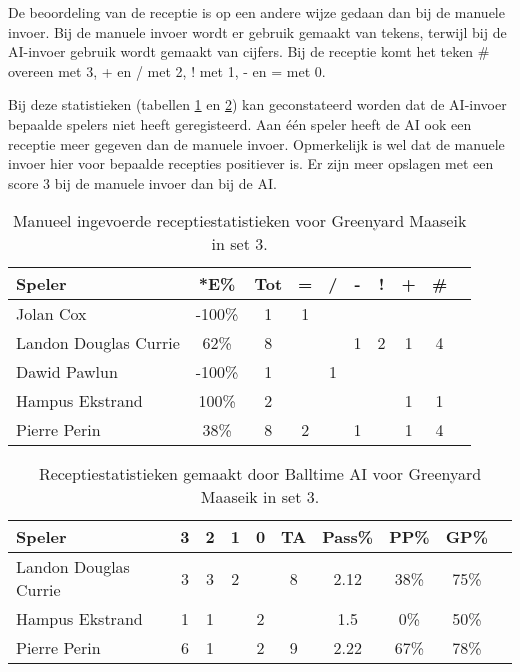 De beoordeling van de receptie is op een andere wijze gedaan dan bij de manuele invoer. Bij de manuele invoer wordt er gebruik gemaakt van tekens, terwijl bij de AI-invoer gebruik wordt gemaakt van cijfers. Bij de receptie komt het teken \# overeen met 3, + en / met 2, ! met 1, - en = met 0.

Bij deze statistieken (tabellen \ref{tab:PL3ReceiveMaaseikMan3} en \ref{tab:PL3ReceiveMaaseikAI3}) kan geconstateerd worden dat de AI-invoer bepaalde spelers niet heeft geregisteerd. Aan één speler heeft de AI ook een receptie meer gegeven dan de manuele invoer. Opmerkelijk is wel dat de manuele invoer hier voor bepaalde recepties positiever is. Er zijn meer opslagen met een score 3 bij de manuele invoer dan bij de AI.

\begin{table}[ht!]
    \centering
    \scriptsize
    \begin{tabular}{|l|c|c|c|c|c|c|c|c|c|} \hline
        \textbf{Speler} & *E\% & Tot & = & / & - & ! & + & \#\\ \hline
        Jolan Cox & -100\% & 1 & 1 &  &  &  &  & \\ 
        Landon Douglas Currie & 62\% & 8 &  &  & 1 & 2 & 1 & 4 \\ 
        Dawid Pawlun & -100\% & 1 &  & 1 &  &  &  &  \\ 
        Hampus Ekstrand & 100\% & 2 &  &  &  &  & 1 & 1 \\ 
        Pierre Perin & 38\% & 8 & 2 &  & 1 &  & 1 & 4 \\ \hline
    \end{tabular}
    \caption[Manueel ingevoerde receptiestatistieken voor Greenyard Maaseik in set 3]{\label{tab:PL3ReceiveMaaseikMan3}Manueel ingevoerde receptiestatistieken voor Greenyard Maaseik in set 3.}
\end{table}

\begin{table}[ht!]
  \centering
  \scriptsize
  \begin{tabular}{|l|c|c|c|c|c|c|c|c|c|} \hline
    \textbf{Speler} & 3 & 2 & 1 & 0 & TA & Pass\% & PP\% & GP\% \\ \hline
    Landon Douglas Currie & 3 & 3 & 2 &  & 8 & 2.12 & 38\% & 75\% \\
    Hampus Ekstrand & 1 & 1 &   & 2 & & 1.5 & 0\% & 50\% \\
    Pierre Perin & 6 & 1 &   & 2 & 9 & 2.22 & 67\% & 78\% \\ \hline
  \end{tabular}
  \caption[Receptiestatistieken gemaakt door Balltime AI voor Greenyard Maaseik in set 3]{\label{tab:PL3ReceiveMaaseikAI3}Receptiestatistieken gemaakt door Balltime AI voor Greenyard Maaseik in set 3.}
\end{table}

